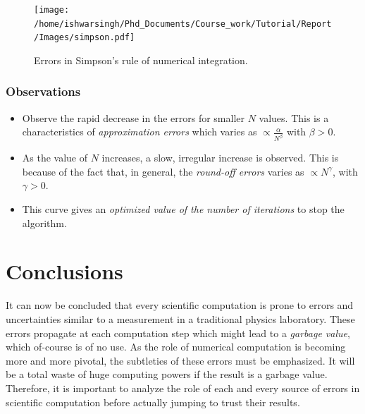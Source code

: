 \documentclass[a4,12pt]{article}
\numberwithin{equation}{subsection}
\begin{document}
\begin{figure}[h]
    \centering
    \texttt{[image: /home/ishwarsingh/Phd\_Documents/Course\_work/Tutorial/Report/Images/simpson.pdf]}
  \caption{Errors in Simpson's rule of numerical integration.}
  \label{fig:simpson}
\end{figure}

\subsubsection{Observations}
  \begin{itemize}
    \item Observe the rapid decrease in the errors for smaller $N$ values. This is a characteristics of \emph{approximation errors} which varies as $\propto\frac{\alpha}{N^{\beta}}$ with $\beta>0$.
    \item As the value of $N$ increases, a slow, irregular increase is observed. This is because of the fact that, in general, the \emph{round-off errors} varies as $\propto N^{\gamma}$, with $\gamma>0$.
    \item This curve gives an \emph{optimized value of the number of iterations} to stop the algorithm.

  \end{itemize}  

  \section{Conclusions}
  It can now be concluded that every scientific computation is prone to errors and uncertainties similar to a measurement in a traditional physics laboratory. These errors propagate at each computation step which might lead to a \emph{garbage value}, which of-course is of no use. As the role of numerical computation is becoming more and more pivotal, the subtleties of these errors must be emphasized. It will be a total waste of huge computing powers if the result is a garbage value. Therefore, it is important to analyze the role of each and every source of errors in scientific computation before actually jumping to trust their results.  \nocite{landau2008survey} \nocite{fadnavis1998some} \nocite{goldberg1991every} \nocite{numeric_ana_1} \nocite{fpc} \nocite{Keinert}
\pagebreak
\printbibliography
\end{document}
